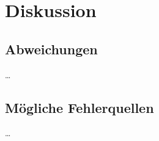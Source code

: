 \section{Diskussion}
\label{sec:diskussion}

\subsection{Abweichungen}

…


\subsection{Mögliche Fehlerquellen}

…
